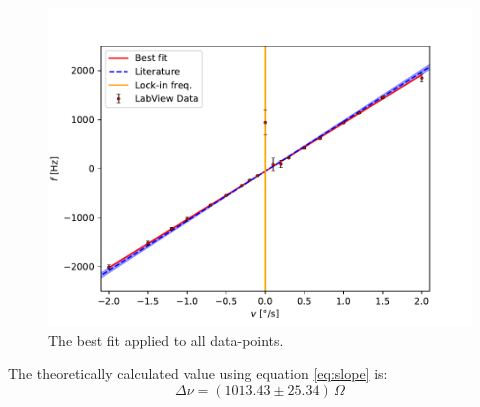 \begin{figure}[h!]
    \centering
    \includegraphics[width=\textwidth]{Gyroscope/Report/plots/slope.pdf}
    \caption{The best fit applied to all data-points.}
    \label{fig:measurements}
\end{figure}
The theoretically calculated value using equation \ref{eq:slope} is:
$$\Delta \nu = (1013.43 \pm 25.34)\, \Omega $$